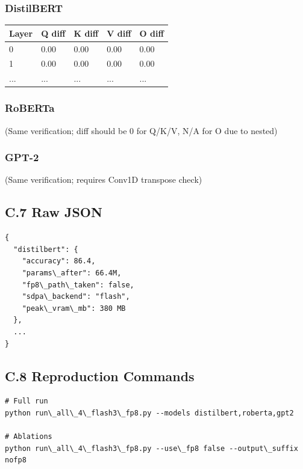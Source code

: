 \subsubsection{DistilBERT}

\begin{table}[H]
\centering
\small
\begin{tabular}{lllll}
\toprule
\textbf{Layer} & \textbf{Q diff} & \textbf{K diff} & \textbf{V diff} & \textbf{O diff} \\
\midrule
0 & 0.00 & 0.00 & 0.00 & 0.00 \\
1 & 0.00 & 0.00 & 0.00 & 0.00 \\
... & ... & ... & ... & ... \\
\bottomrule
\end{tabular}
\end{table}

\subsubsection{RoBERTa}

(Same verification; diff should be 0 for Q/K/V, N/A for O due to nested)

\subsubsection{GPT-2}

(Same verification; requires Conv1D transpose check)

\subsection{C.7 Raw JSON}

\begin{lstlisting}
{
  "distilbert": {
    "accuracy": 86.4,
    "params\_after": 66.4M,
    "fp8\_path\_taken": false,
    "sdpa\_backend": "flash",
    "peak\_vram\_mb": 380 MB
  },
  ...
}
\end{lstlisting}

\subsection{C.8 Reproduction Commands}

\begin{lstlisting}
# Full run
python run\_all\_4\_flash3\_fp8.py --models distilbert,roberta,gpt2

# Ablations
python run\_all\_4\_flash3\_fp8.py --use\_fp8 false --output\_suffix nofp8
\end{lstlisting}

